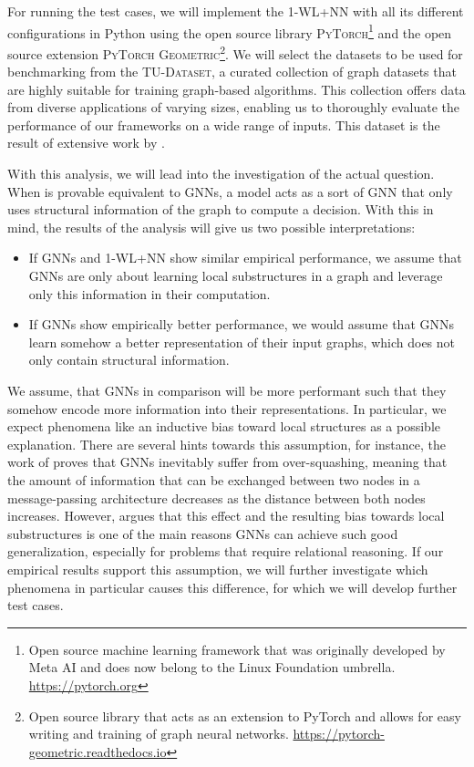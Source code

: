 \documentclass[11pt, dvipsnames, DIV=12]{scrreprt}
\theoremstyle{definition}
\newcommand{\wlnn}{\text{1-WL+NN }}
\begin{document}
For running the test cases, we will implement the 1-WL+NN with all its different configurations in Python using the open source library \textsc{PyTorch}\footnote{Open source machine learning framework that was originally developed by Meta AI and does now belong to the Linux Foundation umbrella. \href{https://pytorch.org}{https://pytorch.org}} and the open source extension \textsc{PyTorch Geometric}\footnote{Open source library that acts as an extension to PyTorch and allows for easy writing and training of graph neural networks. \href{https://pytorch-geometric.readthedocs.io/en/latest}{https://pytorch-geometric.readthedocs.io}}.
We will select the datasets to be used for benchmarking from the \textsc{TU-Dataset}, a curated collection of graph datasets that are highly suitable for training graph-based algorithms. This collection offers data from diverse applications of varying sizes, enabling us to thoroughly evaluate the performance of our frameworks on a wide range of inputs. This dataset is the result of extensive work by \cite{Mor+2020}.

With this analysis, we will lead into the investigation of the actual question. When \wlnn is provable equivalent to GNNs, a \wlnn model acts as a sort of GNN that only uses structural information of the graph to compute a decision. With this in mind, the results of the analysis will give us two possible interpretations:
\begin{itemize}
    \item If GNNs and 1-WL+NN show similar empirical performance, we assume that GNNs are only about learning local substructures in a graph and leverage only this information in their computation.
    \item If GNNs show empirically better performance, we would assume that GNNs learn somehow a better representation of their input graphs, which does not only contain structural information.
\end{itemize}
We assume, that GNNs in comparison will be more performant such that they somehow encode more information into their representations. In particular, we expect phenomena like an inductive bias toward local structures as a possible explanation. There are several hints towards this assumption, for instance, the work of \cite{Giovanni2023} proves that GNNs inevitably suffer from over-squashing, meaning that the amount of information that can be exchanged between two nodes in a message-passing architecture decreases as the distance between both nodes increases. However, \cite{Vignac2020} argues that this effect and the resulting bias towards local substructures is one of the main reasons GNNs can achieve such good generalization, especially for problems that require relational reasoning. If our empirical results support this assumption, we will further investigate which phenomena in particular causes this difference, for which we will develop further test cases. 
\end{document}
